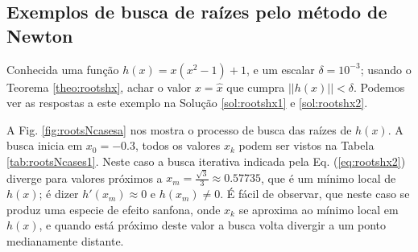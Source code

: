 \newpage
\subsection{Exemplos de busca de raízes pelo método de Newton}


\begin{example}\label{ex:rootshx1}
Conhecida uma função $h(x)=x(x^2-1)+1$, e um escalar $\delta=10^{-3}$;
usando o Teorema \ref{theo:rootshx}, 
achar o valor $x=\hat{x}$ que cumpra $||h(x)||<\delta$.
Podemos ver as respostas a este exemplo na Solução \ref{sol:rootshx1} e \ref{sol:rootshx2}.
\end{example}
\begin{SolutionT}\label{sol:rootshx1}
 A Fig. \ref{fig:rootsNcasesa} nos mostra o processo de busca das raízes de $h(x)$. 
A busca inicia em $x_0=-0.3$, 
todos os valores $x_{k}$ podem ser vistos na
Tabela \ref{tab:rootsNcases1}. 
Neste caso a busca iterativa indicada pela Eq. (\ref{eq:rootshx2}) 
diverge para valores próximos a $x_m=\frac{\sqrt{3}}{3}\approx 0.57735$,
que é um mínimo local de $h(x)$; é dizer $h'(x_m)\approx 0$ e $h(x_m)\neq 0$.
É fácil de observar, que neste caso se produz 
uma especie de efeito sanfona, onde $x_{k}$ se aproxima ao mínimo local em $h(x)$, e quando 
está próximo deste valor a busca volta divergir a um ponto medianamente distante.
\end{SolutionT}


